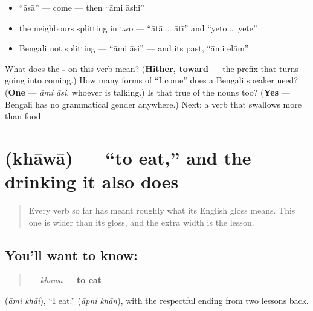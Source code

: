 \begin{itemize}
\raggedright
  \item \textquotedblleft{}āsā\textquotedblright{} — come — then \textquotedblleft{}āmi āshi\textquotedblright{}
  \item the neighbours splitting in two — \textquotedblleft{}ātā … ātī\textquotedblright{} and \textquotedblleft{}yeto … yete\textquotedblright{}
  \item Bengali not splitting — \textquotedblleft{}āmi āsi\textquotedblright{} — and its past, \textquotedblleft{}āmi elām\textquotedblright{}
\end{itemize}

\begin{tcolorbox}[breakable,colback=teal!4,colframe=teal!35!black,title={Before you move on}]
What does the \textbf{-} on this verb mean? (\textbf{Hither, toward} — the prefix that turns going into coming.) How many forms of \textquotedblleft{}I come\textquotedblright{} does a Bengali speaker need? (\textbf{One} — \emph{āmi āsi}, whoever is talking.) Is that true of the nouns too? (\textbf{Yes} — Bengali has no grammatical gender anywhere.) Next: a verb that swallows more than food.
\end{tcolorbox}
\section[\texorpdfstring{\bn{খাওয়া} (khāwā)}{খাওয়া (khāwā)}]{ (khāwā) — \textquotedblleft{}to eat,\textquotedblright{} and the drinking it also does}

\label{lesson:BN-C07-khaowa}



\begin{quote}
Every verb so far has meant roughly what its English gloss means. This one is wider than its gloss, and the extra width is the lesson.
\end{quote}

\subsection*{You'll want to know: }
\begin{quote}
\textbf{} — \emph{khāwā} — \textbf{to eat}
\end{quote}

  (\emph{āmi khāi}), \textquotedblleft{}I eat.\textquotedblright{}   (\emph{āpni khān}), with the respectful ending from two lessons back.

